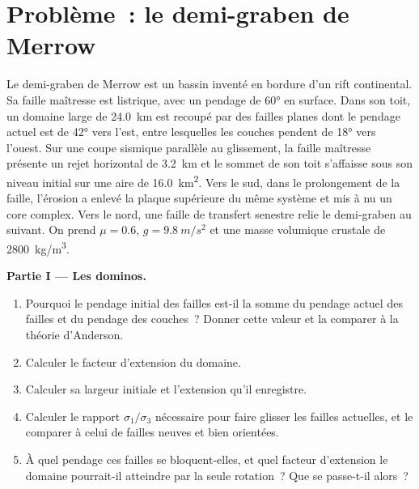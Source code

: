 \section{Problème~: le demi-graben de Merrow}

\begin{problem}
\label{pb:b3:extension-strike-slip:1}
Le demi-graben de Merrow est un bassin inventé en bordure d'un rift
continental. Sa faille maîtresse est listrique, avec un pendage de \ang{60} en surface.
Dans son toit, un domaine large de \qty{24.0}{km} est recoupé par des failles planes
dont le pendage actuel est de \ang{42} vers l'est, entre lesquelles les couches pendent de \ang{18} vers l'ouest. Sur une coupe sismique
parallèle au glissement, la faille maîtresse présente un rejet horizontal de \qty{3.2}{km} et le
sommet de son toit s'affaisse sous son niveau initial sur une aire de
\qty{16.0}{km^2}. Vers le sud, dans le prolongement de la faille, l'érosion a enlevé la
plaque supérieure du même système et mis à nu un core complex. Vers le nord, une
faille de transfert senestre relie le demi-graben au suivant. On prend $\mu =
0.6$, $g = \qty{9.8}{m/s^2}$ et une masse volumique crustale de
\qty{2800}{kg/m^3}.

\medskip\noindent\textbf{Partie I --- Les dominos.}
\begin{enumerate}
  \item Pourquoi le pendage initial des failles est-il la somme du pendage actuel des failles et
        du pendage des couches~? Donner cette valeur et la comparer à la théorie d'Anderson.
  \item Calculer le facteur d'extension du domaine.
  \item Calculer sa largeur initiale et l'extension qu'il enregistre.
  \item Calculer le rapport $\sigma_1/\sigma_3$ nécessaire pour faire glisser les failles actuelles,
        et le comparer à celui de failles neuves et bien orientées.
  \item À quel pendage ces failles se bloquent-elles, et quel facteur d'extension le
        domaine pourrait-il atteindre par la seule rotation~? Que se passe-t-il alors~?
\end{enumerate}


\end{problem}
